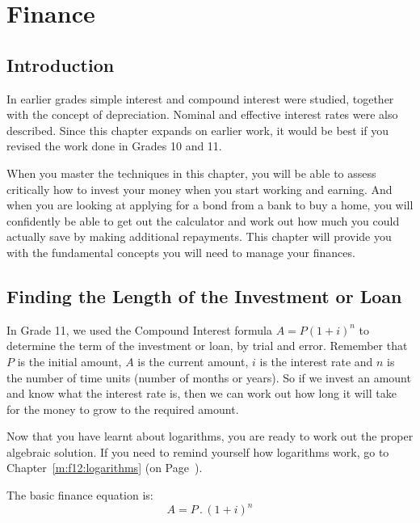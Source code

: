 \chapter{Finance}
\label{m:f12}

\section{Introduction}
In earlier grades simple interest and compound interest were studied, together with the concept of depreciation. Nominal and effective interest rates were also described. Since this chapter expands on earlier work, it would be best if you revised the work done in Grades 10 and 11.%

When you master the techniques in this chapter, you will be able to
assess critically how to invest your money when you start working and
earning. And when you are looking at applying for a bond from a bank
to buy a home, you will confidently be able to get out the calculator
and work out how much you could actually save by making additional
repayments. This chapter will provide you with the fundamental
concepts you will need to manage your finances.

\section{Finding the Length of the Investment or Loan}
\label{sec:m:f12:term}


In Grade 11, we used the Compound Interest formula $A = P(1 + i)^n$ to determine the term of the investment or loan, by trial and error. Remember that $P$ is the initial amount, $A$ is the current amount, $i$ is the interest rate and $n$ is the number of time units (number of months or years). So if we invest an amount and know what the interest rate is, then we can work out how long it will take for the money to grow to the required amount.

Now that you have learnt about logarithms, you are ready to work out the proper algebraic solution. If you need to remind yourself how logarithms work, go to Chapter~\ref{m:f12:logarithms} (on Page~\pageref{m:f12:logarithms}).

The basic finance equation is:
\begin{equation*}
A = P \,.\, (1+i)^n
\end{equation*}

